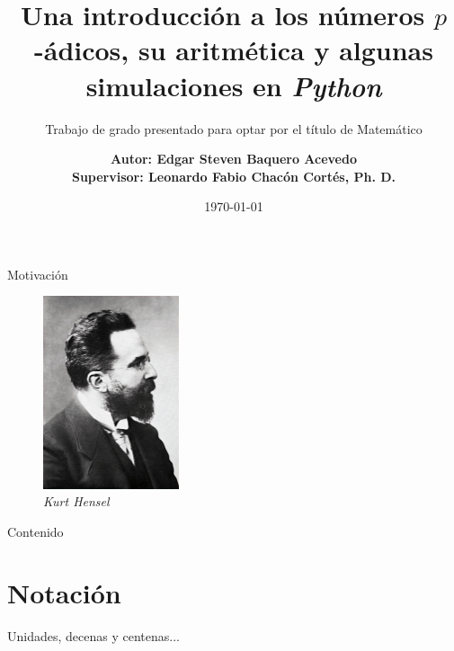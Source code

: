 \documentclass{beamer}
\title{Una introducción a los números $p$-ádicos, su aritmética y algunas simulaciones en \textit{Python}}
\subtitle{Trabajo de grado presentado para optar por el título de
Matemático}
\date{\today}
\author{\bf{Autor: }Edgar Steven Baquero Acevedo
	\\ \bf{Supervisor: }Leonardo Fabio Chacón Cortés, Ph. D.}
\theoremstyle{definition}
\numberwithin{equation}{section}
\begin{document}
  \maketitle

\begin{frame}{Motivación}
	
	\begin{figure}
		
		\includegraphics[width=4cm]{img/kurt_hensel.jpg}
		\caption{\textit{Kurt Hensel}}
	\end{figure}

\end{frame}



\begin{frame}{Contenido}
	\tableofcontents
\end{frame}

  \section{Notación}

  \begin{frame}{Unidades, decenas y centenas...}
    
    \begin{center}
    \end{center}
  \end{frame}
\end{document}
